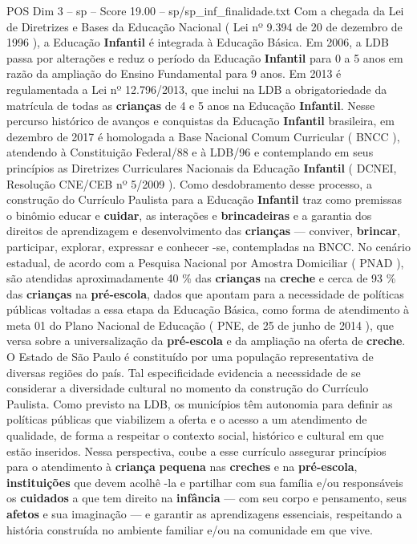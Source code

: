 \begin{textsample}{POS Dim 3 – sp – Score 19.00 – sp/sp\_inf\_finalidade.txt}
Com a chegada da Lei de Diretrizes e Bases da Educação Nacional ( Lei nº 9.394 de 20 de dezembro de 1996 ), a Educação \textbf{Infantil} é integrada à Educação Básica.
Em 2006, a LDB passa por alterações e reduz o período da Educação \textbf{Infantil} para 0 a 5 anos em razão da ampliação do Ensino Fundamental para 9 anos.
Em 2013 é regulamentada a Lei nº 12.796/2013, que inclui na LDB a obrigatoriedade da matrícula de todas as \textbf{crianças} de 4 e 5 anos na Educação \textbf{Infantil}.
Nesse percurso histórico de avanços e conquistas da Educação \textbf{Infantil} brasileira, em dezembro de 2017 é homologada a Base Nacional Comum Curricular ( BNCC ), atendendo à Constituição Federal/88 e à LDB/96 e contemplando em seus princípios as Diretrizes Curriculares Nacionais da Educação \textbf{Infantil} ( DCNEI, Resolução CNE/CEB nº 5/2009 ).
Como desdobramento desse processo, a construção do Currículo Paulista para a Educação \textbf{Infantil} traz como premissas o binômio educar e \textbf{cuidar}, as interações e \textbf{brincadeiras} e a garantia dos direitos de aprendizagem e desenvolvimento das \textbf{crianças} — conviver, \textbf{brincar}, participar, explorar, expressar e conhecer -se, contempladas na BNCC.
No cenário estadual, de acordo com a Pesquisa Nacional por Amostra Domiciliar ( PNAD ), são atendidas aproximadamente 40 \% das \textbf{crianças} na \textbf{creche} e cerca de 93 \% das \textbf{crianças} na \textbf{pré-escola}, dados que apontam para a necessidade de políticas públicas voltadas a essa etapa da Educação Básica, como forma de atendimento à meta 01 do Plano Nacional de Educação ( PNE, de 25 de junho de 2014 ), que versa sobre a universalização da \textbf{pré-escola} e da ampliação na oferta de \textbf{creche}.
O Estado de São Paulo é constituído por uma população representativa de diversas regiões do país.
Tal especificidade evidencia a necessidade de se considerar a diversidade cultural no momento da construção do Currículo Paulista.
Como previsto na LDB, os municípios têm autonomia para definir as políticas públicas que viabilizem a oferta e o acesso a um atendimento de qualidade, de forma a respeitar o contexto social, histórico e cultural em que estão inseridos.
Nessa perspectiva, coube a esse currículo assegurar princípios para o atendimento à \textbf{criança} \textbf{pequena} nas \textbf{creches} e na \textbf{pré-escola}, \textbf{instituições} que devem acolhê -la e partilhar com sua família e/ou responsáveis os \textbf{cuidados} a que tem direito na \textbf{infância} — com seu corpo e pensamento, seus \textbf{afetos} e sua imaginação — e garantir as aprendizagens essenciais, respeitando a história construída no ambiente familiar e/ou na comunidade em que vive.

\end{textsample}
